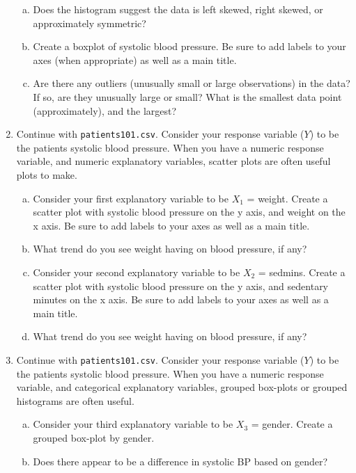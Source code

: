 \documentclass[twocolumn, 10pt, oneside]{article}
\begin{document}
\begin{enumerate}
\begin{enumerate}[(a)]
	\item Does the histogram suggest the data is left skewed, right skewed, or approximately symmetric?  
	\item Create a boxplot of systolic blood pressure.  Be sure to add labels to your axes (when appropriate) as well as a main title.
\item Are there any outliers (unusually small or large observations) in the data?  If so, are they unusually large or small?  What is the smallest data point (approximately), and the largest?
\end{enumerate}
\item Continue with \texttt{patients101.csv}.  Consider your response variable  ($Y$) to be the patients systolic blood pressure.  When you have a numeric response variable, and numeric explanatory variables, scatter plots are often useful plots to make.
\begin{enumerate}[(a)]
	\item Consider your first explanatory variable to be $X_1$ = weight.  Create a scatter plot with systolic blood pressure on the y axis, and weight on the x axis.  Be sure to add labels to your axes as well as a main title.
	\item What trend do you see weight having on blood pressure, if any?  
	\item Consider your second explanatory variable to be $X_2$ = sedmins.  Create a scatter plot with systolic blood pressure on the y axis, and sedentary minutes on the x axis.  Be sure to add labels to your axes as well as a main title.
	\item What trend do you see weight having on blood pressure, if any? 
	\end{enumerate}
\item Continue with \texttt{patients101.csv}.  Consider your response variable  ($Y$) to be the patients systolic blood pressure.  When you have a numeric response variable, and categorical explanatory variables, grouped box-plots or grouped histograms are often useful.
\begin{enumerate}[(a)]
	\item Consider your third explanatory variable to be $X_3$ = gender.  Create a grouped box-plot by gender. 
	\item Does there appear to be a difference in systolic BP based on gender?

\end{enumerate}
\end{enumerate}
\end{document}
